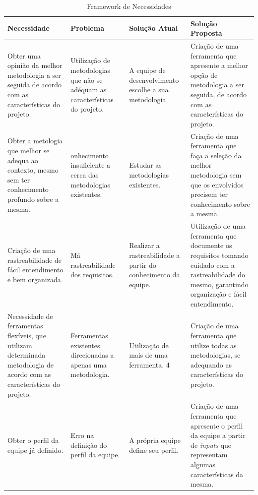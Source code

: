 \begin{table}[H]
\centering
\begin{tabular}{|p{5cm}|p{3cm}|p{3cm}|p{5cm}|}
\hline
\textbf{Necessidade} & \textbf{Problema} & \textbf{Solução Atual} & \textbf{Solução Proposta}  \\ \hline

Obter uma opinião da melhor metodologia a ser seguida de acordo com as características do projeto. & Utilização de metodologias que não se adéquam as características do projeto. & A equipe de desenvolvimento escolhe a sua metodologia. & Criação de uma ferramenta que apresente a melhor opção de metodologia a ser seguida, de acordo com as características do projeto.\\ \hline

Obter a metologia que melhor se adequa ao contexto, mesmo sem ter conhecimento profundo sobre a mesma. & onhecimento insuficiente a cerca das metodologias existentes. & Estudar as metodologias existentes. & Criação de uma ferramenta que faça a seleção da melhor metodologia sem que os envolvidos precisem ter conhecimento sobre a mesma. \\ \hline

Criação de uma rastreabilidade de fácil entendimento e bem organizada. & Má rastreabilidade dos requisitos. & Realizar a rastreabilidade a partir do conhecimento da equipe. & Utilização de uma ferramenta que documente os requisitos tomando cuidado com a rastreabilidade do mesmo, garantindo organização e fácil entendimento. \\ \hline

Necessidade de ferramentas flexíveis, que utilizam determinada metodologia de acordo com as características do projeto. & Ferramentas existentes direcionadas a apenas uma metodologia. & Utilização de mais de uma ferramenta. 4 & Criação de uma ferramenta que utilize todas as metodologias, se adequando as características do projeto. \\ \hline

Obter o perfil da equipe já definido. & Erro na definição do perfil da equipe. & A própria equipe define seu perfil. & Criação de uma ferramenta que apresente o perfil da equipe a partir de \textit{inputs} que representam algumas características da mesma. \\ \hline

\end{tabular}
\label{}
\caption{Framework de Necessidades}
\end{table}

